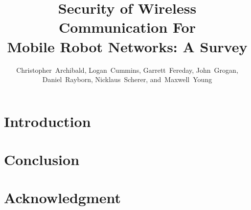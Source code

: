 \documentclass[journal]{IEEEtran}
\begin{document}
\title{Security of Wireless Communication For \\Mobile Robot Networks: A Survey}

\author{Christopher~Archibald,
		Logan~Cummins,
		Garrett~Fereday,
        John~Grogan,
        Daniel~Rayborn,
        Nicklaus~Scherer,
        and~Maxwell~Young%
}

\maketitle

\begin{abstract}
\end{abstract}

\begin{IEEEkeywords}
\end{IEEEkeywords}









\IEEEpeerreviewmaketitle

\section{Introduction}

\section{Conclusion}

\section*{Acknowledgment}



\end{document}

